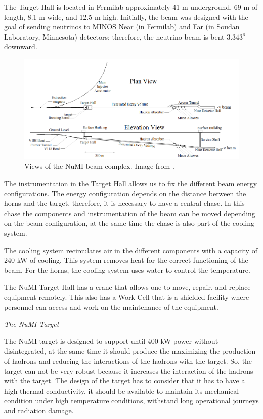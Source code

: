 The Target Hall is located in Fermilab approximately 41 m underground, 69 m of length, 8.1 m wide, and 12.5 m high. Initially, the beam was designed with the goal of sending neutrinos to MINOS Near (in Fermilab) and Far (in Soudan Laboratory, Minnesota) detectors; therefore, the neutrino beam is bent $3.343^o$ downward.  

\begin{figure}[!htb]
\centering
\includegraphics[scale=0.4]{Figures/Chapter2/NuMIFacilityViews.png}
        \caption{Views of the NuMI beam complex. Image from \cite{Numi}.} 
\label{fig:MnvExp:NuMI:NuMIviews}
\end{figure}

The instrumentation in the Target Hall allows us to fix the different beam energy configurations. The energy configuration depends on the distance between the horns and the target, therefore, it is necessary to have a central chase. In this chase the components and instrumentation of the beam can be moved depending on the beam configuration, at the same time the chase is also part of the cooling system. 

The cooling system recirculates air in the different components with a capacity of 240 kW of cooling. This system removes heat for the correct functioning of the beam. For the horns, the cooling system uses water to control the temperature.

The NuMI Target Hall has a crane that allows one to move, repair, and replace equipment remotely. This also has a Work Cell that is a shielded facility where personnel can access and work on the maintenance of the equipment. 

\textit{The NuMI Target}

The NuMI target is designed to support until 400 kW power without disintegrated, at the same time it should produce the maximizing the production of hadrons and reducing the interactions of the hadrons with the target. So, the target can not be very robust because it increases the interaction of the hadrons with the target. The design of the target has to consider that it has to have a high thermal conductivity, it should be available to maintain its mechanical condition under high temperature conditions, withstand long operational journeys and radiation damage. 

